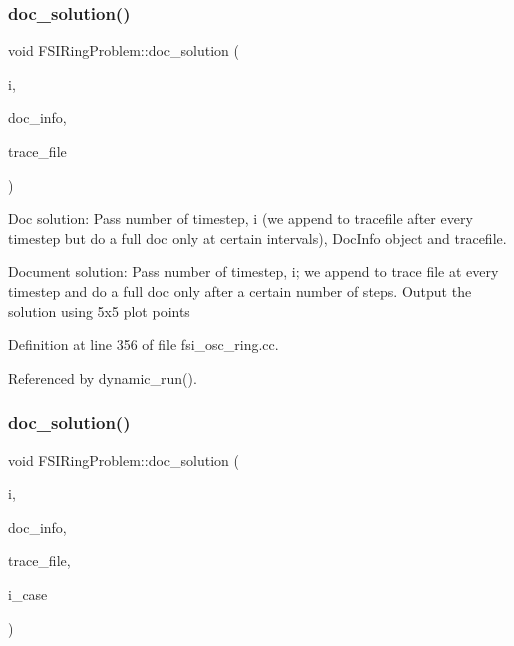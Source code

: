 \subsubsection{\texorpdfstring{doc\+\_\+solution()}{doc\_solution()}\hspace{0.1cm}{\footnotesize\ttfamily [1/2]}}
{\footnotesize\ttfamily void F\+S\+I\+Ring\+Problem\+::doc\+\_\+solution (\begin{DoxyParamCaption}\item[{const unsigned \&}]{i,  }\item[{Doc\+Info \&}]{doc\+\_\+info,  }\item[{ofstream \&}]{trace\+\_\+file }\end{DoxyParamCaption})}



Doc solution\+: Pass number of timestep, i (we append to tracefile after every timestep but do a full doc only at certain intervals), Doc\+Info object and tracefile. 

Document solution\+: Pass number of timestep, i; we append to trace file at every timestep and do a full doc only after a certain number of steps. Output the solution using 5x5 plot points 

Definition at line 356 of file fsi\+\_\+osc\+\_\+ring.\+cc.



Referenced by dynamic\+\_\+run().

\mbox{\label{classFSIRingProblem_a6ffbe3f55308ea33cf2cc204062ef4ea}} 
\subsubsection{\texorpdfstring{doc\+\_\+solution()}{doc\_solution()}\hspace{0.1cm}{\footnotesize\ttfamily [2/2]}}
{\footnotesize\ttfamily void F\+S\+I\+Ring\+Problem\+::doc\+\_\+solution (\begin{DoxyParamCaption}\item[{const unsigned \&}]{i,  }\item[{Doc\+Info \&}]{doc\+\_\+info,  }\item[{ofstream \&}]{trace\+\_\+file,  }\item[{const unsigned \&}]{i\+\_\+case }\end{DoxyParamCaption})}



